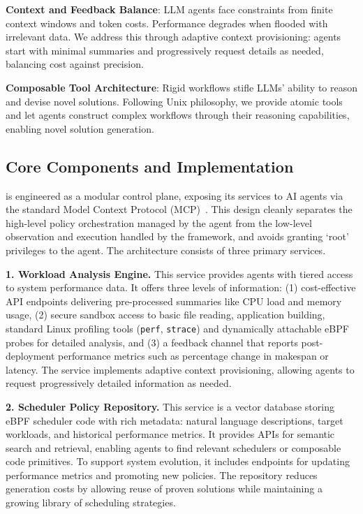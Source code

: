 \textbf{Context and Feedback Balance}: LLM agents face constraints from finite context windows and token costs. Performance degrades when flooded with irrelevant data. We address this through adaptive context provisioning: agents start with minimal summaries and progressively request details as needed, balancing cost against precision.

\textbf{Composable Tool Architecture}: Rigid workflows stifle LLMs' ability to reason and devise novel solutions. Following Unix philosophy, we provide atomic tools and let agents construct complex workflows through their reasoning capabilities, enabling novel solution generation.

\subsection{Core Components and Implementation}
\sys is engineered as a modular control plane, exposing its services to AI agents via the standard Model Context Protocol (MCP)~\cite{anthropic2024mcp}. This design cleanly separates the high-level policy orchestration managed by the agent from the low-level observation and execution handled by the framework, and avoids granting `root' privileges to the agent. The architecture consists of three primary services.

\textbf{1. Workload Analysis Engine.} This service provides agents with tiered access to system performance data. It offers three levels of information: (1) cost-effective API endpoints delivering pre-processed summaries like CPU load and memory usage, (2) secure sandbox access to basic file reading, application building, standard Linux profiling tools (\texttt{perf}, \texttt{strace}) and dynamically attachable eBPF probes for detailed analysis, and (3) a feedback channel that reports post-deployment performance metrics such as percentage change in makespan or latency. The service implements adaptive context provisioning, allowing agents to request progressively detailed information as needed.

\textbf{2. Scheduler Policy Repository.} This service is a vector database storing eBPF scheduler code with rich metadata: natural language descriptions, target workloads, and historical performance metrics. It provides APIs for semantic search and retrieval, enabling agents to find relevant schedulers or composable code primitives. To support system evolution, it includes endpoints for updating performance metrics and promoting new policies. The repository reduces generation costs by allowing reuse of proven solutions while maintaining a growing library of scheduling strategies.

